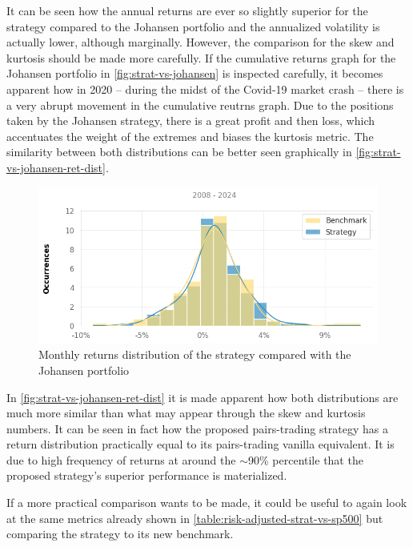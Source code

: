 It can be seen how the annual returns are ever so slightly superior for the strategy compared to the Johansen portfolio and the annualized volatility is actually lower, although marginally. However, the comparison for the skew and kurtosis should be made more carefully. If the cumulative returns graph for the Johansen portfolio in \autoref{fig:strat-vs-johansen} is inspected carefully, it becomes apparent how in 2020 -- during the midst of the Covid-19 market crash -- there is a very abrupt movement in the cumulative reutrns graph. Due to the positions taken by the Johansen strategy, there is a great profit and then loss, which accentuates the weight of the extremes and biases the kurtosis metric. The similarity between both distributions can be better seen graphically in \autoref{fig:strat-vs-johansen-ret-dist}.

\begin{figure}[ht]
    \captionsetup{justification=centering}
    \includegraphics[width=\linewidth]{assets/strat-vs-johansen-ret-dist.png}
    \caption{Monthly returns distribution of the strategy compared with the Johansen portfolio}
    \label{fig:strat-vs-johansen-ret-dist}
\end{figure}

In \autoref{fig:strat-vs-johansen-ret-dist} it is made apparent how both distributions are much more similar than what may appear through the skew and kurtosis numbers. It can be seen in fact how the proposed pairs-trading strategy has a return distribution practically equal to its pairs-trading vanilla equivalent. It is due to high frequency of returns at around the $\sim$90\% percentile that the proposed strategy's superior performance is materialized.    

If a more practical comparison wants to be made, it could be useful to again look at the same metrics already shown in \autoref{table:risk-adjusted-strat-vs-sp500} but comparing the strategy to its new benchmark. 

